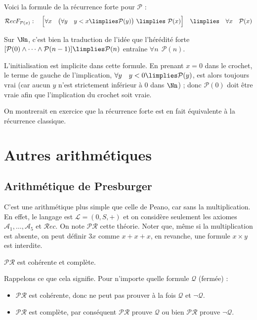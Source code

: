 \documentclass[11pt,class=report,crop=false]{standalone}
\begin{document}
Voici la formule de la récurrence forte pour $\mathcal{P}$ :
\[ 
\mathcal{R}ecF_{\mathcal{P}(x)} : \quad 
\Big[ 
\forall x \quad 
\big( \forall y \quad y < x \limplies \mathcal{P}(y) \big) \ \limplies \ \mathcal{P}(x)
\Big] \quad \limplies \quad 
\forall x \quad \mathcal{P}(x) 
\]

Sur $\Nn$, c'est bien la traduction de l'idée que l'hérédité forte $[\mathcal{P}(0) \land \dots \land \mathcal{P}(n-1)] \limplies \mathcal{P}(n)$ entraîne $\forall n \ \ \mathcal{P}(n)$.

L'initialisation est implicite dans cette formule. En prenant $x=0$ dans le crochet, le terme de gauche de l'implication, \og$\forall y \quad y < 0 \limplies \mathcal{P}(y)$\fg, est alors toujours vrai (car aucun $y$ n'est strictement inférieur à $0$ dans $\Nn$) ; donc $\mathcal{P}(0)$ doit être vraie afin que l'implication du crochet soit vraie.

On montrerait en exercice que la récurrence forte est en fait équivalente à la récurrence classique.



\section{Autres arithmétiques}

\subsection{Arithmétique de Presburger}


C'est une arithmétique plus simple que celle de Peano, car sans la multiplication.
En effet, le langage est $\mathcal{L} = (0, S, +)$ et on considère seulement les axiomes $\mathcal{A}_1, \dots, \mathcal{A}_5$ et $\mathcal{R}ec$.
On note $\mathcal{PR}$ cette théorie.
Noter que, même si la multiplication est absente, on peut définir $3x$ comme $x+x+x$, en revanche, une formule \og{}$x \times y$\fg{} est interdite.

\begin{theoreme}
	$\mathcal{PR}$ est cohérente et complète.
\end{theoreme}

Rappelons ce que cela signifie. Pour n'importe quelle formule $\mathcal{Q}$ (fermée) :
\begin{itemize}
	\item $\mathcal{PR}$ est cohérente, donc ne peut pas prouver à la fois $\mathcal{Q}$ et $\lnot \mathcal{Q}$.
	\item $\mathcal{PR}$ est complète, par conséquent $\mathcal{PR}$ prouve $\mathcal{Q}$ ou bien $\mathcal{PR}$ prouve $\lnot \mathcal{Q}$.
\end{itemize}
\end{document}
